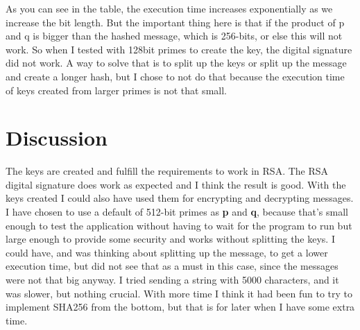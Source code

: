 \documentclass[12pt, letterpaper]{article}
\begin{document}
As you can see in the table, the execution time increases exponentially as we increase the bit length. But the important thing here is that if the product of p and q is bigger than the hashed message, which is 256-bits, or else this will not work. So when I tested with 128bit primes to create the key, the digital signature did not work. A way to solve that is to split up the keys or split up the message and create a longer hash, but I chose to not do that because the execution time of keys created from larger primes is not that small.

\section*{Discussion}
The keys are created and fulfill the requirements to work in RSA. The RSA digital signature does work as expected and I think the result is good. With the keys created I could also have used them for encrypting and decrypting messages. I have chosen to use a default of 512-bit primes as \textbf{p} and \textbf{q}, because that's small enough to test the application without having to wait for the program to run but large enough to provide some security and works without splitting the keys. 
I could have, and was thinking about splitting up the message, to get a lower execution time, but did not see that as a must in this case, since the messages were not that big anyway. I tried sending a string with 5000 characters, and it was slower, but nothing crucial. With more time I think it had been fun to try to implement SHA256 from the bottom, but that is for later when I have some extra time. 
\end{document}
